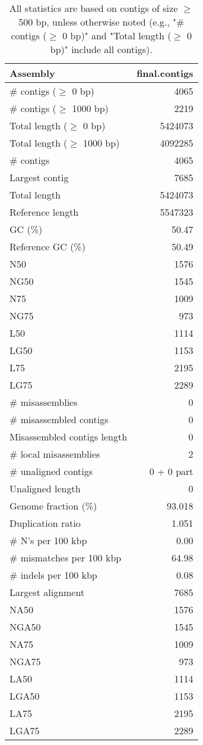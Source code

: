 \documentclass[12pt,a4paper]{article}
\begin{document}
\begin{table}[ht]
\begin{center}
\caption{All statistics are based on contigs of size $\geq$ 500 bp, unless otherwise noted (e.g., "\# contigs ($\geq$ 0 bp)" and "Total length ($\geq$ 0 bp)" include all contigs).}
\begin{tabular}{|l*{1}{|r}|}
\hline
Assembly & final.contigs \\ \hline
\# contigs ($\geq$ 0 bp) & 4065 \\ \hline
\# contigs ($\geq$ 1000 bp) & 2219 \\ \hline
Total length ($\geq$ 0 bp) & 5424073 \\ \hline
Total length ($\geq$ 1000 bp) & 4092285 \\ \hline
\# contigs & 4065 \\ \hline
Largest contig & 7685 \\ \hline
Total length & 5424073 \\ \hline
Reference length & 5547323 \\ \hline
GC (\%) & 50.47 \\ \hline
Reference GC (\%) & 50.49 \\ \hline
N50 & 1576 \\ \hline
NG50 & 1545 \\ \hline
N75 & 1009 \\ \hline
NG75 & 973 \\ \hline
L50 & 1114 \\ \hline
LG50 & 1153 \\ \hline
L75 & 2195 \\ \hline
LG75 & 2289 \\ \hline
\# misassemblies & 0 \\ \hline
\# misassembled contigs & 0 \\ \hline
Misassembled contigs length & 0 \\ \hline
\# local misassemblies & 2 \\ \hline
\# unaligned contigs & 0 + 0 part \\ \hline
Unaligned length & 0 \\ \hline
Genome fraction (\%) & 93.018 \\ \hline
Duplication ratio & 1.051 \\ \hline
\# N's per 100 kbp & 0.00 \\ \hline
\# mismatches per 100 kbp & 64.98 \\ \hline
\# indels per 100 kbp & 0.08 \\ \hline
Largest alignment & 7685 \\ \hline
NA50 & 1576 \\ \hline
NGA50 & 1545 \\ \hline
NA75 & 1009 \\ \hline
NGA75 & 973 \\ \hline
LA50 & 1114 \\ \hline
LGA50 & 1153 \\ \hline
LA75 & 2195 \\ \hline
LGA75 & 2289 \\ \hline
\end{tabular}
\end{center}
\end{table}
\end{document}
